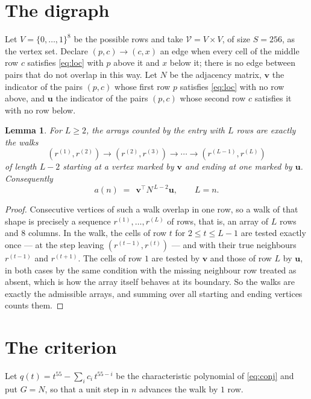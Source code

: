 \documentclass[11pt,a4paper]{article}
\theoremstyle{plain}
\newtheorem{lemma}[theorem]{Lemma}
\theoremstyle{definition}
\begin{document}
\section{The digraph}

Let $V=\{0,\dots,1\}^{8}$ be the possible rows and take
$\mathcal V=V\times V$, of size $S=256$, as the vertex set. Declare $(p,c)\to(c,x)$ an edge
when every cell of the middle row $c$ satisfies \eqref{eq:loc} with $p$ above it and $x$
below it; there is no edge between pairs that do not overlap in this way. Let $N$ be the
adjacency matrix, $\mathbf{v}$ the indicator of the pairs $(p,c)$ whose first row $p$
satisfies \eqref{eq:loc} with no row above, and $\mathbf{u}$ the indicator of
the pairs $(p,c)$ whose second row $c$ satisfies it with no row below.

\begin{lemma}\label{lem:walk}
For $L\ge2$, the arrays counted by the entry with $L$ rows are exactly the walks
\[
(r^{(1)},r^{(2)})\to(r^{(2)},r^{(3)})\to\cdots\to(r^{(L-1)},r^{(L)})
\]
of length $L-2$ starting at a vertex marked by $\mathbf{v}$ and ending at one marked by
$\mathbf{u}$. Consequently
\[
a(n)\;=\;\,\mathbf{v}^{\!\top}N^{\,L-2}\mathbf{u},\qquad L=n .
\]
\end{lemma}

\begin{proof}
Consecutive vertices of such a walk overlap in one row, so a walk of that shape is
precisely a sequence $r^{(1)},\dots,r^{(L)}$ of rows, that is, an array of $L$ rows
and $8$ columns. In the walk, the cells of row $t$ for $2\le t\le L-1$ are tested
exactly once --- at the step leaving $(r^{(t-1)},r^{(t)})$ --- and with their true
neighbours $r^{(t-1)}$ and $r^{(t+1)}$. The cells of row $1$ are tested by
$\mathbf{v}$ and those of row $L$ by $\mathbf{u}$, in both cases by the same condition
with the missing neighbour row treated as absent, which is how the array itself behaves at
its boundary. So the walks are exactly the admissible arrays, and summing over all starting
and ending vertices counts them.
\end{proof}

\section{The criterion}

Let $q(t)=t^{55}-\sum_i c_i\,t^{55-i}$ be the characteristic polynomial of
\eqref{eq:conj} and put $G=N$, so that a unit step in $n$ advances the walk by
$1$ row.
\end{document}
